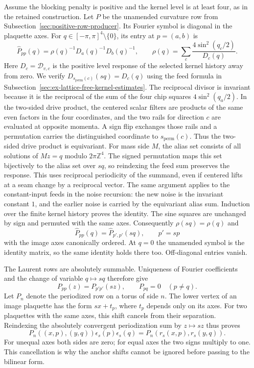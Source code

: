 Assume the blocking penalty is positive and the kernel level is at
least four, as in the retained construction. Let $P$ be the unamended curvature row from
Subsection~\ref{sec:positive-row-producer}. Its Fourier symbol is diagonal
in the plaquette axes. For $q\in[-\pi,\pi]^4\setminus\{0\}$, its entry at
$p=(a,b)$ is
\[
 \widehat P_{pp}(q)=
      \rho(q)^{-1}D_a(q)^{-1}D_b(q)^{-1},
 \qquad
 \rho(q)=\sum_c\frac{4\sin^2(q_c/2)}{D_c(q)}.
\]
Here $D_c=\mathscr D_{v,c}$ is the positive level response of the
selected kernel history away from zero. We verify
$D_{s_{\mathrm{perm}}(c)}(sq)=D_c(q)$ using the feed formula in
Subsection~\ref{sec:ex-lattice-free-kernel-estimates}. The reciprocal
divisor is invariant because it is the reciprocal of the sum of the
four chip squares $4\sin^2(q_a/2)$. In the two-sided drive product,
the centered scalar filters are products of the same even factors in
the four coordinates, and the two rails for direction $c$ are evaluated
at opposite momenta. A sign flip exchanges those rails and a
permutation carries the distinguished coordinate to
$s_{\mathrm{perm}}(c)$. Thus the two-sided drive product is equivariant.
For mass side $M$, the alias set consists of all solutions of
$Mz=q$ modulo $2\pi\mathbb Z^4$. The signed permutation maps this set
bijectively to the alias set over $sq$, so reindexing the feed sum
preserves the response. This uses reciprocal periodicity of the
summand, even if centered lifts at a seam change by a reciprocal vector.
The same argument applies to the constant-input feeds in the noise
recursion: the new noise is the invariant constant $1$, and the earlier
noise is carried by the equivariant alias sum. Induction over the finite
kernel history proves the identity. The sine squares are unchanged
by sign and permuted with the same axes. Consequently $\rho(sq)=\rho(q)$
and
\[
            \widehat P_{pp}(q)
                =\widehat P_{p',p'}(sq),\qquad p'=s p
\]
with the image axes canonically ordered. At $q=0$ the unamended symbol is the identity matrix, so the same
identity holds there too. Off-diagonal entries vanish.

The Laurent rows are absolutely summable. Uniqueness of Fourier
coefficients and the change of variable $q\mapsto sq$ therefore give
\[
 P_{pp}(z)=P_{p'p'}(sz),\qquad P_{pq}=0\quad(p\ne q).
\]
Let $P_n$ denote the periodized row on a torus of side $n$.
The lower vertex of an image plaquette has the form $sx+t_p$, where
$t_p$ depends only on its axes. For two plaquettes with the same axes,
this shift cancels from their separation. Reindexing the absolutely
convergent periodization sum by $z\mapsto sz$ thus proves
\begin{equation}\label{eq:quadratic-face-symmetry}
 P_n((x,p),(y,q))\epsilon_s(p)\epsilon_s(q)
       =P_n(r_s(x,p),r_s(y,q)).
\end{equation}
For unequal axes both sides are zero; for equal axes the two signs
multiply to one. This cancellation is why the anchor shifts cannot
be ignored before passing to the bilinear form.

